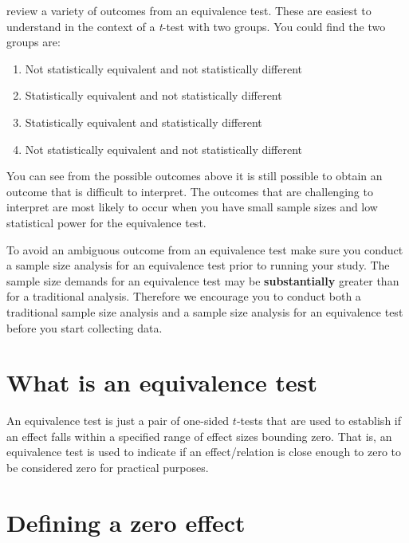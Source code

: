 \documentclass[
]{krantz}
\begin{document}
\citep{lakens2018equivalence} review a variety of outcomes from an equivalence test. These are easiest to understand in the context of a \emph{t}-test with two groups. You could find the two groups are:

\begin{enumerate}
\def\labelenumi{\arabic{enumi}.}
\item
  Not statistically equivalent and not statistically different
\item
  Statistically equivalent and not statistically different
\item
  Statistically equivalent and statistically different
\item
  Not statistically equivalent and not statistically different
\end{enumerate}

You can see from the possible outcomes above it is still possible to obtain an outcome that is difficult to interpret. The outcomes that are challenging to interpret are most likely to occur when you have small sample sizes and low statistical power for the equivalence test.

To avoid an ambiguous outcome from an equivalence test make sure you conduct a sample size analysis for an equivalence test prior to running your study. The sample size demands for an equivalence test may be \textbf{substantially} greater than for a traditional analysis. Therefore we encourage you to conduct both a traditional sample size analysis and a sample size analysis for an equivalence test before you start collecting data.

\hypertarget{what-is-an-equivalence-test}{%
\section{What is an equivalence test}\label{what-is-an-equivalence-test}}

An equivalence test is just a pair of one-sided \(t\)-tests that are used to establish if an effect falls within a specified range of effect sizes bounding zero. That is, an equivalence test is used to indicate if an effect/relation is close enough to zero to be considered zero for practical purposes.

\hypertarget{defining-a-zero-effect}{%
\section{Defining a zero effect}\label{defining-a-zero-effect}}
\end{document}
